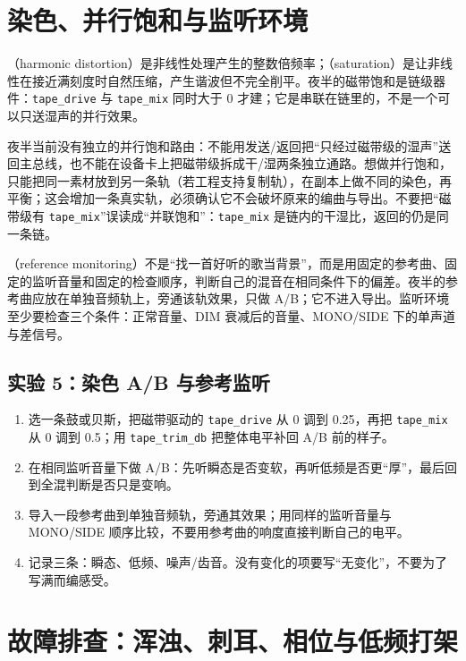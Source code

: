 \section{染色、并行饱和与监听环境}

（harmonic distortion）是非线性处理产生的整数倍频率；（saturation）是让非线性在接近满刻度时自然压缩，产生谐波但不完全削平。夜半的磁带饱和是链级器件：\texttt{tape\_drive} 与 \texttt{tape\_mix} 同时大于 0 才建；它是串联在链里的，不是一个可以只送湿声的并行效果。

夜半当前没有独立的并行饱和路由：不能用发送/返回把“只经过磁带级的湿声”送回主总线，也不能在设备卡上把磁带级拆成干/湿两条独立通路。想做并行饱和，只能把同一素材放到另一条轨（若工程支持复制轨），在副本上做不同的染色，再平衡；这会增加一条真实轨，必须确认它不会破坏原来的编曲与导出。不要把“磁带级有 \texttt{tape\_mix}”误读成“并联饱和”：\texttt{tape\_mix} 是链内的干湿比，返回的仍是同一条链。

（reference monitoring）不是“找一首好听的歌当背景”，而是用固定的参考曲、固定的监听音量和固定的检查顺序，判断自己的混音在相同条件下的偏差。夜半的参考曲应放在单独音频轨上，旁通该轨效果，只做 A/B；它不进入导出。监听环境至少要检查三个条件：正常音量、DIM 衰减后的音量、MONO/SIDE 下的单声道与差信号。

\subsection{实验 5：染色 A/B 与参考监听}

\begin{enumerate}
  \item 选一条鼓或贝斯，把磁带驱动的 \texttt{tape\_drive} 从 0 调到 0.25，再把 \texttt{tape\_mix} 从 0 调到 0.5；用 \texttt{tape\_trim\_db} 把整体电平补回 A/B 前的样子。
  \item 在相同监听音量下做 A/B：先听瞬态是否变软，再听低频是否更“厚”，最后回到全混判断是否只是变响。
  \item 导入一段参考曲到单独音频轨，旁通其效果；用同样的监听音量与 MONO/SIDE 顺序比较，不要用参考曲的响度直接判断自己的电平。
  \item 记录三条：瞬态、低频、噪声/齿音。没有变化的项要写“无变化”，不要为了写满而编感受。
\end{enumerate}

\section{故障排查：浑浊、刺耳、相位与低频打架}

